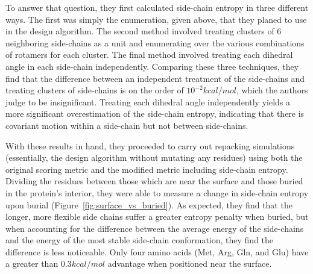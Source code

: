 To answer that question, they first calculated side-chain entropy in three different ways. The first was simply the enumeration, given above, that they planed to use in the design algorithm. The second method involved treating clusters of 6 neighboring side-chains as a unit and enumerating over the various combinations of rotamers for each cluster. The final method involved treating each dihedral angle in each side-chain independently. Comparing these three techniques, they find that the difference between an independent treatment of the side-chains and treating clusters of side-chains is on the order of $10^{-2} kcal/mol$, which the authors judge to be insignificant. Treating each dihedral angle independently yields a more significant overestimation of the side-chain entropy, indicating that there is covariant motion within a side-chain but not between side-chains.

With these results in hand, they proceeded to carry out repacking simulations (essentially, the design algorithm without mutating any residues) using both the original scoring metric and the modified metric including side-chain entropy. Dividing the residues between those which are near the surface and those buried in the protein's interior, they were able to measure a change in side-chain entropy upon burial (Figure~\ref{fig:surface_vs_buried}). As expected, they find that the longer, more flexible side chains suffer a greater entropy penalty when buried, but when accounting for the difference between the average energy of the side-chains and the energy of the most stable side-chain conformation, they find the difference is less noticeable. Only four amino acids (Met, Arg, Gln, and Glu) have a greater than $0.3 kcal/mol$ advantage when positioned near the surface.

